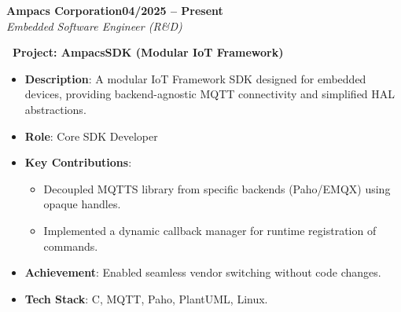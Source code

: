 \documentclass[letterpaper,10pt]{article}
\newcommand{\heading}[2]{
  \hspace{10pt}#1\hfill#2\\
}
\newcommand{\headingBf}[2]{
  \heading{\textbf{#1}}{\textbf{#2}}
}
\newcommand{\headingIt}[2]{
  \heading{\textit{#1}}{\textit{#2}}
}
\newenvironment{resume_list}{
  \vspace{-7pt}
  \begin{itemize}[itemsep=-2px, parsep=1pt, leftmargin=30pt]
}{
  \end{itemize}
}
\begin{document}
   \headingBf{Ampacs Corporation}{04/2025 -- Present}
   \headingIt{Embedded Software Engineer (R\&D)}{}
   \begin{resume_list}
     \item \textbf{\faSitemap\ Project: AmpacsSDK (Modular IoT Framework)}
       \begin{itemize}[itemsep=1pt, leftmargin=15pt, label=-]
         \item \textbf{Description}: A modular IoT Framework SDK designed for embedded devices, providing backend-agnostic MQTT connectivity and simplified HAL abstractions.
         \item \textbf{Role}: Core SDK Developer
         \item \textbf{Key Contributions}:
           \begin{itemize}[itemsep=0pt, leftmargin=10pt, label=$\circ$]
              \item Decoupled MQTTS library from specific backends (Paho/EMQX) using opaque handles.
              \item Implemented a dynamic callback manager for runtime registration of commands.
           \end{itemize}
         \item \textbf{Achievement}: Enabled seamless vendor switching without code changes.
         \item \textbf{Tech Stack}: C, MQTT, Paho, PlantUML, Linux.
       \end{itemize}


\end{resume_list}
\end{document}
